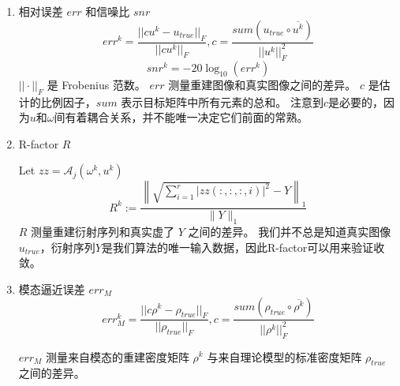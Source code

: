 \documentclass[12pt]{article}
\begin{document}
\begin{enumerate}
	\item
	 相对误差 $err$ 和信噪比 $snr$
	$$
	err^k = \dfrac{|| c u^k - u_{true} ||_F  }{||c u^k||_F}, c = \frac{sum(u_{true} \circ \overline{u^k}) }{||u^k||_F^2}
	$$
	$$
	snr^k = -20\log_{10}(err^k)
	$$
$|| \cdot ||_F$ 是 Frobenius 范数。 $err$ 测量重建图像和真实图像之间的差异。 $c$ 是估计的比例因子，$sum$ 表示目标矩阵中所有元素的总和。 注意到$c$是必要的，因为$u$和$\omega$间有着耦合关系，并不能唯一决定它们前面的常熟。
	
	\item R-factor $R$
	
	Let $zz = \mathcal{A}_{j}\left(\omega^{k}, u^{k}\right)$
	$$
	R^{k}:=\frac{\left\| \sqrt{\sum_{i=1}^{r} |zz(:,:,:,i)|^2}-Y\right\|_{1}}{\|Y\|_{1}}
	$$
	$R$ 测量重建衍射序列和真实虚了 $Y$ 之间的差异。 我们并不总是知道真实图像$u_{true}$，衍射序列$Y$是我们算法的唯一输入数据，因此R-factor可以用来验证收敛。
	\item 模态逼近误差 $err_M$
	$$
	err_M^k = \frac{||c\rho^k - \rho_{true}||_F}{||\rho_{true}||_F},
	c = \frac{sum(\rho_{true} \circ \overline{\rho^k}) }{||\rho^k||_F^2}
	$$
	
	$err_M$ 测量来自模态的重建密度矩阵 $\rho^k$ 与来自理论模型的标准密度矩阵 $\rho_{true}$ 之间的差异。
	
\end{enumerate} 
\end{document}
